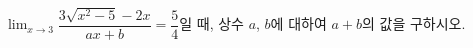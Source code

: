 $\displaystyle\lim_{x\to 3}\dfrac{3\sqrt{x^2-5}-2x}{ax+b}=\dfrac{5}{4}$일 때, 상수 $a$, $b$에 대하여 $a+b$의 값을 구하시오.
